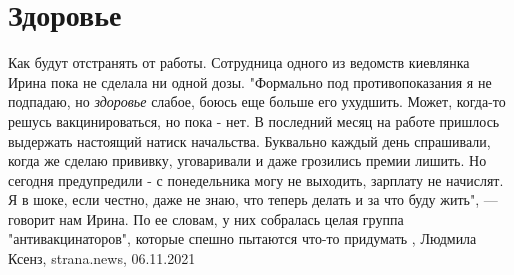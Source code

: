  
 
 
 
 
\chapter{Здоровье}

Как будут отстранять от работы.  Сотрудница одного из ведомств киевлянка Ирина
пока не сделала ни одной дозы.  "Формально под противопоказания я не подпадаю,
но \emph{здоровье} слабое, боюсь еще больше его ухудшить. Может, когда-то
решусь вакцинироваться, но пока - нет. В последний месяц на работе пришлось
выдержать настоящий натиск начальства.  Буквально каждый день спрашивали, когда
же сделаю прививку, уговаривали и даже грозились премии лишить. Но сегодня
предупредили - с понедельника могу не выходить, зарплату не начислят. Я в шоке,
если честно, даже не знаю, что теперь делать и за что буду жить", — говорит нам
Ирина.  По ее словам, у них собралась целая группа "антивакцинаторов", которые
спешно пытаются что-то придумать
, 
Людмила Ксенз, strana.news, 06.11.2021
